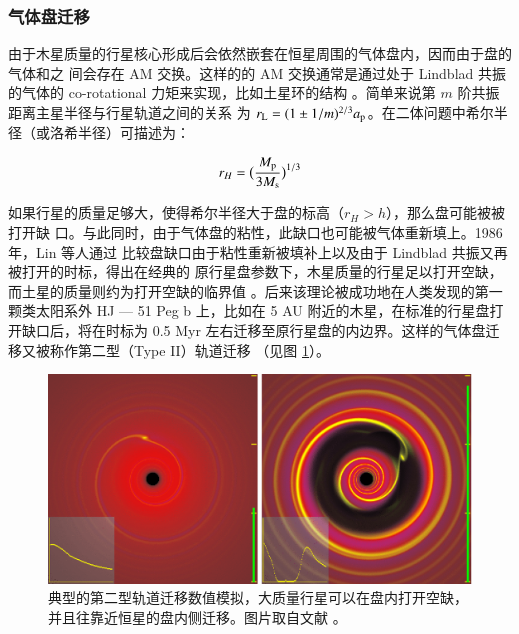 \subsubsection{气体盘迁移} \label{sec:diskmig}

由于木星质量的行星核心形成后会依然嵌套在恒星周围的气体盘内，因而由于盘的气体和之
间会存在 AM 交换。这样的的 AM 交换通常是通过处于 Lindblad 共振的气体的 co-rotational 
力矩来实现\cite{Binney1987,GoldreichTremaine1979}，比如土星环的结构
\cite{GoldreichTremaine1980}。简单来说第 $m$ 阶共振距离主星半径与行星轨道之间的关系
为 $r_\mathrm{L} = (1\pm 1/m)^{2/3} a_\mathrm{p}$。在二体问题中希尔半径（或洛希半径）可描述为：

\begin{equation} \label{eq:hillradius}
r_H = \big( \frac{M_\mathrm{p}}{3M_\mathrm{s}} \big) ^{1/3}
\end{equation} 

如果行星的质量足够大，使得希尔半径大于盘的标高（$r_H > h$），那么盘可能被被打开缺
口。与此同时，由于气体盘的粘性，此缺口也可能被气体重新填上。1986 年，Lin 等人通过
比较盘缺口由于粘性重新被填补上以及由于 Lindblad 共振又再被打开的时标，得出在经典的
原行星盘参数下，木星质量的行星足以打开空缺，而土星的质量则约为打开空缺的临界值
\cite{Lin1986,Ward1997}。后来该理论被成功地在人类发现的第一颗类太阳系外 HJ --- 51 Peg
 b 上\cite{Lin1996}，比如在 5 AU 附近的木星，在标准的行星盘打开缺口后，将在时标为 0.5 
 Myr 左右迁移至原行星盘的内边界。这样的气体盘迁移又被称作第二型（Type II）轨道迁移
 （见图 \ref{fig:diskmig}）。

\begin{figure}[t]
\centering
\includegraphics[width=1.0\textwidth]{figures/chapter4/fig3_diskmig.eps}
\caption[典型的第二型轨道迁移数值模拟，大质量行星可以在盘内打开空缺，并且往靠近恒星的盘内侧迁移。图片版权 Armitage\/Rice。]{典型的第二型轨道迁移数值模拟，大质量行星可以在盘内打开空缺，并且往靠近恒星的盘内侧迁移。图片取自文献 。}
\label{fig:diskmig}
\end{figure}



